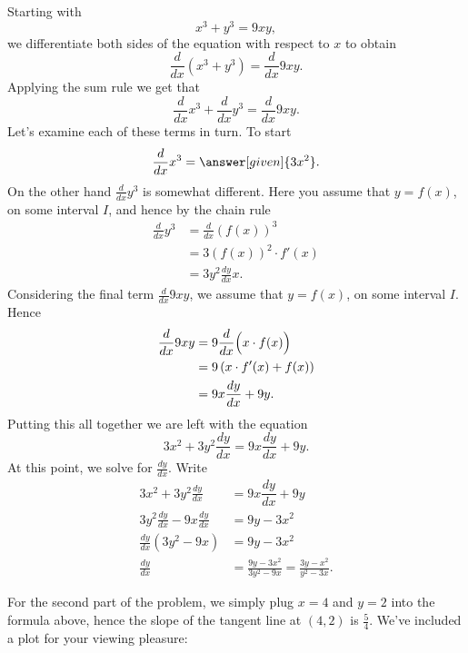 \documentclass{ximera}
\begin{document}
\begin{example}
\begin{explanation}
Starting with 
\[
x^3+y^3 = 9xy,
\]
we differentiate both sides of the
equation with respect to $x$ to obtain
\[
\frac{d}{dx} \left(x^3+y^3\right) = \frac{d}{dx} 9xy.
\]
Applying the sum rule we get that
\[
\frac{d}{dx} x^3+\frac{d}{dx} y^3 = \frac{d}{dx} 9xy.
\]
Let's examine each of these terms in turn. To start
\[
\frac{d}{dx} x^3 = \answer[given]{3x^2}.
\]
On the other hand $\frac{d}{dx} y^3$ is somewhat different. Here you assume that $y = f(x)$, on some interval $I$, and hence by the chain rule
\begin{align*}
\frac{d}{dx} y^3 &= \frac{d}{dx} (f(x))^3 \\ 
&= 3(f(x))^2 \cdot f'(x) \\
&= 3y^2\frac{dy}{dx}{x}.
\end{align*}
Considering the final term $\frac{d}{dx} 9xy$, we assume that $y=f(x)$, on some interval $I$. Hence 
\begin{align*}
\frac{d}{dx} 9xy &= 9\frac{d}{dx} \Bigl(x\cdot f(x)\Bigr) \\
&= 9 \left(x\cdot f'(x) + f(x)\right)\\
&= 9x \frac{dy}{dx} + 9y.
\end{align*}
Putting this all together we are left with the equation
\[
3x^2 + 3y^2\frac{dy}{dx} =9x \frac{dy}{dx} + 9y.
\]
At this point, we solve for $\frac{dy}{dx}$. Write
\begin{align*}
3x^2 + 3y^2\frac{dy}{dx} &= 9x \dfrac{dy}{dx} + 9y\\
3y^2\frac{dy}{dx} -  9x \frac{dy}{dx} &= 9y - 3x^2\\
\frac{dy}{dx}\left(3y^2-9x\right)&= 9y - 3x^2\\
\frac{dy}{dx} &=\frac{9y - 3x^2}{3y^2-9x} = \frac{3y - x^2}{y^2-3x}.
\end{align*}

For the second part of the problem, we simply plug $x=4$ and $y=2$
into the formula above, hence the slope of the tangent line at $(4,2)$
is $\frac{5}{4}$. We've included a plot for your viewing pleasure:
\begin{image}
\end{image}
\end{explanation}
\end{example}
\end{document}
